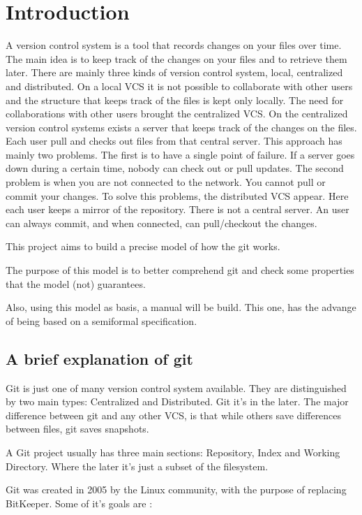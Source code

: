 \section{Introduction}

A \Gls{version control system} is a tool that records changes on your
files over time. The main idea is to keep track of the changes on your
files and to retrieve them later. There are mainly three kinds of 
\Gls{version control system}, local, centralized and distributed. On
a local VCS it is not possible to collaborate with other users and
the structure that keeps track of the files is kept only locally. The
need for collaborations with other users brought the centralized VCS.
On the centralized version control systems exists a server that keeps
track of the changes on the files. Each user pull and checks out files
from that central server. This approach has mainly two problems. The
first is to have a single point of failure. If a server goes down
during a certain time, nobody can check out or pull updates. The
second problem is when you are not connected to the network. You
cannot pull or commit your changes. To solve this problems, the
distributed VCS appear. Here each user keeps a mirror of the
repository. There is not a central server. An user can always commit,
and when connected, can pull/checkout the changes.

This project aims to build a precise model of how the git works. \par
The purpose of this model is to better comprehend git and 
check some properties that the model (not) guarantees. \par
Also, using this model as basis, a manual will be build. This one,
has the advange of being based on a semiformal specification.

\subsection{A brief explanation of git}

Git is just one of many \Gls{version control system} available. 
They are 
distinguished by two main types: Centralized and Distributed.
Git it's in the later. The major difference between git and any
other VCS, is that while others save differences between files, git saves
snapshots. \par
A Git project usually has three main sections: Repository, Index and
Working Directory. 
Where the later it's just a subset of the filesystem. \par
Git was created in 2005 by the Linux community, 
with the purpose of replacing BitKeeper. Some of it's
goals are \cite{progit}: 

